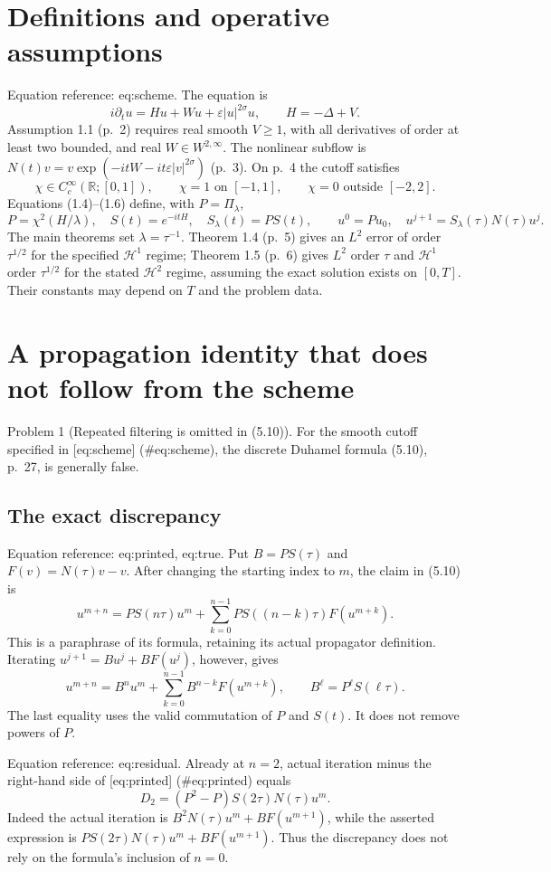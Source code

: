 \documentclass[10pt]{article}
\begin{document}
\section*{Definitions and operative assumptions}
Equation reference: eq:scheme. The equation is \[i\partial_tu=Hu+Wu+\varepsilon |u|^{2\sigma}u,\qquad H=-\Delta+V.\] Assumption 1.1 (p. 2) requires real smooth \(V\ge1\), with all derivatives of order at least two bounded, and real \(W\in W^{2,\infty}\). The nonlinear subflow is \(N(t)v=v\exp(-itW-it\varepsilon |v|^{2\sigma})\) (p. 3). On p. 4 the cutoff satisfies \[\chi\in C_c^\infty(\mathbb R;[0,1]),\qquad
 \chi=1\text{ on }[-1,1],\qquad \chi=0\text{ outside }[-2,2].\] Equations (1.4)–(1.6) define, with \(P=\Pi_\lambda\), \[
 P=\chi^2(H/\lambda),\quad S(t)=e^{-itH},\quad S_\lambda(t)=PS(t),
 \qquad u^0=Pu_0,\quad u^{j+1}=S_\lambda(\tau)N(\tau)u^j.\] The main theorems set \(\lambda=\tau^{-1}\). Theorem 1.4 (p. 5) gives an \(L^2\) error of order \(\tau^{1/2}\) for the specified \(\mathcal H^1\) regime; Theorem 1.5 (p. 6) gives \(L^2\) order \(\tau\) and \(\mathcal H^1\) order \(\tau^{1/2}\) for the stated \(\mathcal H^2\) regime, assuming the exact solution exists on \([0,T]\). Their constants may depend on \(T\) and the problem data.\par
\section*{A propagation identity that does not follow from the scheme}
Problem 1 (Repeated filtering is omitted in (5.10)).  For the smooth cutoff specified in [eq:scheme] (\#eq:scheme), the discrete Duhamel formula (5.10), p. 27, is generally false.\par
\subsection*{The exact discrepancy}
Equation reference: eq:printed, eq:true. Put \(B=PS(\tau)\) and \(F(v)=N(\tau)v-v\). After changing the starting index to \(m\), the claim in (5.10) is \[
 u^{m+n}=PS(n\tau)u^m+
       \sum_{k=0}^{n-1}PS((n-k)\tau)F(u^{m+k}).\] This is a paraphrase of its formula, retaining its actual propagator definition. Iterating \(u^{j+1}=Bu^j+BF(u^j)\), however, gives \[
 u^{m+n}=B^nu^m+\sum_{k=0}^{n-1}B^{n-k}F(u^{m+k}),\qquad
 B^\ell=P^\ell S(\ell\tau).\] The last equality uses the valid commutation of \(P\) and \(S(t)\). It does not remove powers of \(P\).\par
Equation reference: eq:residual. Already at \(n=2\), actual iteration minus the right-hand side of [eq:printed] (\#eq:printed) equals \[
 D_2=(P^2-P)S(2\tau)N(\tau)u^m.\] Indeed the actual iteration is \(B^2N(\tau)u^m+BF(u^{m+1})\), while the asserted expression is \(PS(2\tau)N(\tau)u^m+BF(u^{m+1})\). Thus the discrepancy does not rely on the formula’s inclusion of \(n=0\).\par
\end{document}
